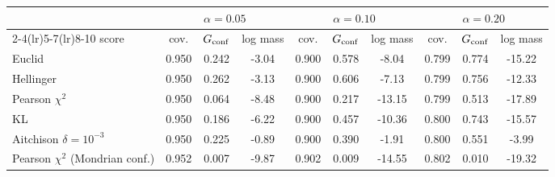 \begin{tabular}{lccccccccc}\toprule
 & \multicolumn{3}{c}{$\alpha=0.05$} & \multicolumn{3}{c}{$\alpha=0.10$} & \multicolumn{3}{c}{$\alpha=0.20$}\\
\cmidrule(lr){2-4}\cmidrule(lr){5-7}\cmidrule(lr){8-10}
score & cov. & $G_{\rm conf}$ & log mass & cov. & $G_{\rm conf}$ & log mass & cov. & $G_{\rm conf}$ & log mass\\\midrule
Euclid & 0.950 & 0.242 & -3.04 & 0.900 & 0.578 & -8.04 & 0.799 & 0.774 & -15.22\\
Hellinger & 0.950 & 0.262 & -3.13 & 0.900 & 0.606 & -7.13 & 0.799 & 0.756 & -12.33\\
Pearson $\chi^2$ & 0.950 & 0.064 & -8.48 & 0.900 & 0.217 & -13.15 & 0.799 & 0.513 & -17.89\\
KL & 0.950 & 0.186 & -6.22 & 0.900 & 0.457 & -10.36 & 0.800 & 0.743 & -15.57\\
Aitchison $\delta{=}10^{-3}$ & 0.950 & 0.225 & -0.89 & 0.900 & 0.390 & -1.91 & 0.800 & 0.551 & -3.99\\
Pearson $\chi^2$ (Mondrian conf.) & 0.952 & 0.007 & -9.87 & 0.902 & 0.009 & -14.55 & 0.802 & 0.010 & -19.32\\
\bottomrule\end{tabular}
